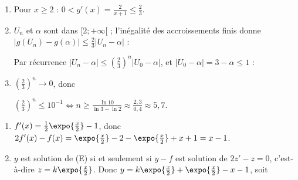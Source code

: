 \begin{description}
\begin{enumerate}
\begin{enumerate}
				$U_0 = 3 \geq 2$ ; si $U_n \geq 2$, alors $U_{n+1} = g(U_n) \geq 2$ d'après 3. \par\noindent{}
			\item {}
				Pour $x \geq 2$ : $0 < g'(x) = \frac{2}{x + 1} \leq \frac{2}{3}$. \par\noindent{}
			\item {}
				$U_n$ et $\alpha$ sont dans $[2;+\infty[$ ; l'inégalité des accroissements finis donne $|g(U_n) - g(\alpha)| \leq \frac{2}{3}|U_n - \alpha|$ :
				\par\noindent{}
				Par récurrence $|U_n - \alpha| \leq \left(\frac{2}{3}\right)^n|U_0 - \alpha|$, et $|U_0 - \alpha| = 3 - \alpha \leq 1$ :
				\par\noindent{}
			\item {}
				$\left(\frac{2}{3}\right)^n \to 0$, donc \par\noindent{}
				$\left(\frac{2}{3}\right)^n \leq 10^{-1} \iff n \geq \frac{\ln 10}{\ln 3 - \ln 2} \approx \frac{2{,}3}{0{,}4} \approx 5{,}7$.
				\par\noindent{}
		\end{enumerate}
	\end{enumerate}
	\item[C. ]
	\begin{enumerate}
		\item {}
			$f'(x) = \frac{1}{2}\expo{\frac{x}{2}} - 1$, donc $2f'(x) - f(x) = \expo{\frac{x}{2}} - 2 - \expo{\frac{x}{2}} + x + 1 = x - 1$.
			\par\noindent{}
		\item {}
			$y$ est solution de (E) si et seulement si $y - f$ est solution de $2z' - z = 0$, c'est-à-dire $z = k\expo{\frac{x}{2}}$.
			Donc $y = k\expo{\frac{x}{2}} + \expo{\frac{x}{2}} - x - 1$, soit
			\par\noindent{}
	\end{enumerate}
\end{description}
